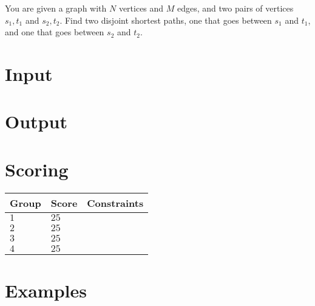 

You are given a graph with $N$ vertices and $M$ edges, and two pairs of vertices $s_1, t_1$ and 
$s_2, t_2$. Find two disjoint shortest paths, one that goes between $s_1$ and $t_1$, and one that
goes between $s_2$ and $t_2$.


\section*{Input}


\section*{Output}


\section*{Scoring}

\noindent
\begin{tabular}{| l | l | l |}
  \hline
  Group & Score & Constraints \\ \hline
  $1$    & $25$        &   \\ \hline 
  $2$    & $25$        &   \\ \hline
  $3$    & $25$        &   \\ \hline
  $4$    & $25$        &   \\ \hline 
\end{tabular}

\section*{Examples}
